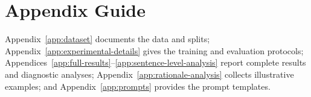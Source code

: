 \documentclass[11pt]{article}
\begin{document}














\clearpage
\appendix
\raggedbottom
\renewcommand{\small}{\normalsize}
\renewcommand{\footnotesize}{\normalsize}
\renewcommand{\scriptsize}{\normalsize}
\captionsetup{font=normalsize}
\section*{Appendix Guide}
\noindent
Appendix~\ref{app:dataset} documents the data and splits;
Appendix~\ref{app:experimental-details} gives the training and evaluation
protocols; Appendices~\ref{app:full-results}--\ref{app:sentence-level-analysis}
report complete results and diagnostic analyses; Appendix~\ref{app:rationale-analysis}
collects illustrative examples; and Appendix~\ref{app:prompts} provides the
prompt templates.








\end{document}
